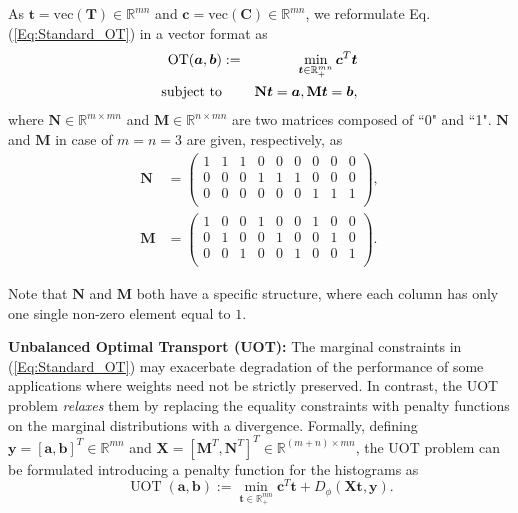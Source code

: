 \documentclass[twoside]{article}
\theoremstyle{plain}
\newcommand{\R}{\mathbb{R}}
\newcommand{\mat}[1]{\mathbf{#1}}
\renewcommand{\vec}[1]{\bm{#1}}
\begin{document}
As $\vec{t} = \text{vec}({\mat{T}}) \in \mathbb{R}^{mn}$ and $\vec{c} = \text{vec}({\mat{C}}) \in \mathbb{R}^{mn}$, we reformulate Eq.(\ref{Eq:Standard_OT}) in a vector format as \citep{Chapel_NeurIPS_2021}
\begin{eqnarray}
\label{Eq:Vector_OT}
\operatorname{OT}(\vec{a},\vec{b}) &:=& \min_{\vec{t} \in \R_{+}^{mn}} \vec{c}^T\vec{t} \\
\text{subject\ to}&& \mat{N}\vec{t} = \vec{a}, \mat{M}\vec{t} = \vec{b}, \notag
\end{eqnarray}
where $\mat{N} \in \R^{m \times mn}$ and $\mat{M} \in \R^{n \times mn}$ are two matrices composed of ``0" and ``1". $\mat{N}$ and $\mat{M}$ in case of $m=n=3$ are given, respectively, as
\begin{equation*}
\begin{split}
\mat{N}&=\begin{pmatrix}
1&1&1& 0& 0& 0& 0& 0&0\\
0 & 0& 0&1&1&1& 0& 0&0\\
0 & 0& 0& 0& 0& 0&1&1&1\\
\end{pmatrix},\\
\mat{M}&=\begin{pmatrix}
 1& 0& 0&1& 0& 0&1& 0&0\\
 0&1& 0& 0&1& 0& 0&1&0\\
 0& 0&1& 0& 0&1& 0& 0&1\\
 \end{pmatrix}.
  \end{split}
 \end{equation*}

Note that $\mat{N}$ and $\mat{M}$ both have a specific structure, where each column has only one single non-zero element equal to $1$. 

 
{\bf Unbalanced Optimal Transport (UOT):} The marginal constraints in (\ref{Eq:Standard_OT}) may exacerbate degradation of the performance of some applications where weights need not be strictly preserved. In contrast, the UOT problem {\it relaxes} them by replacing the equality constraints with penalty functions on the marginal distributions with a divergence. Formally, defining $\vec{y} = [\vec{a}, \vec{b}]^T \in \mathbb{R}^{mn}$ and $\mat{X} = [\mat{M}^T,\mat{N}^T]^T \in \mathbb{R}^{(m+n) \times mn}$, the UOT problem can be formulated introducing a penalty function for the histograms as \citep{Chapel_NeurIPS_2021}
\begin{equation}
\label{eq:uot}
\operatorname{UOT}(\vec{a},\vec{b}) := \min_{\vec{t} \in \R_{+}^{mn}} \vec{c}^T\vec{t} + D_\phi(\mat{X}\vec{t},\vec{y}).
\end{equation}
\end{document}
